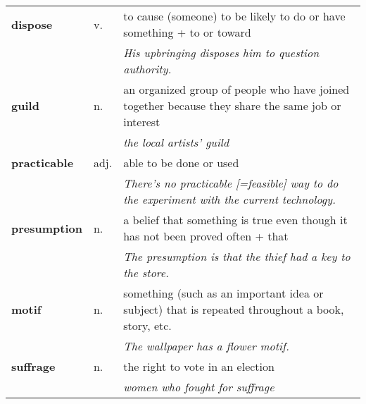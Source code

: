 \documentclass[a4paper]{article}
\begin{document}
\begin{longtable}{llp{11cm}}
\textbf{dispose} & v. &  to cause (someone) to be likely to do or have something + to or toward \\
 & & \textit{His upbringing disposes him to question authority.}\\[0.08cm]
\textbf{guild} & n. &  an organized group of people who have joined together because they share the same job or interest \\
 & & \textit{the local artists' guild}\\[0.08cm]
\textbf{practicable} & adj. &  able to be done or used \\
 & & \textit{There's no practicable [=feasible] way to do the experiment with the current technology.}\\[0.08cm]
\textbf{presumption} & n. &  a belief that something is true even though it has not been proved often + that \\
 & & \textit{The presumption is that the thief had a key to the store.}\\[0.08cm]
\textbf{motif} & n. &  something (such as an important idea or subject) that is repeated throughout a book, story, etc.\\
 & & \textit{The wallpaper has a flower motif.}\\[0.08cm]
\textbf{suffrage} & n. &  the right to vote in an election \\
 & & \textit{women who fought for suffrage}\\[0.08cm]
\end{longtable}
\end{document}
